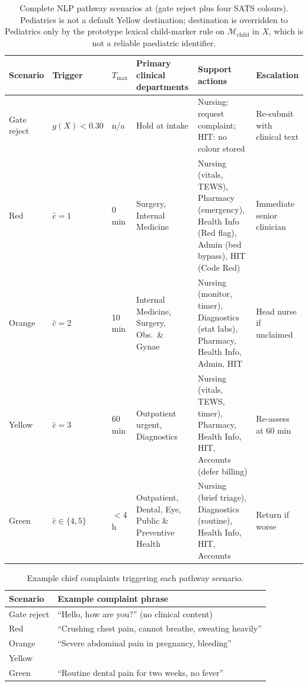 \begin{table}[H]
\centering
\scriptsize
\begin{tabular}{|p{1.5cm}|p{1.6cm}|p{0.9cm}|p{2.4cm}|p{3.1cm}|p{2.2cm}|}
\hline
\textbf{Scenario} & \textbf{Trigger} & \(T_{\max}\) & \textbf{Primary clinical departments} & \textbf{Support actions} & \textbf{Escalation} \\
\hline
Gate reject & \(g(X)<0.30\) & n/a & Hold at intake & Nursing: request complaint; HIT: no colour stored & Re-submit with clinical text \\
Red & \(\hat{c}=1\) & 0 min & Surgery, Internal Medicine & Nursing (vitals, TEWS), Pharmacy (emergency), Health Info (Red flag), Admin (bed bypass), HIT (Code Red) & Immediate senior clinician \\
Orange & \(\hat{c}=2\) & 10 min & Internal Medicine, Surgery, Obs.\ \& Gynae & Nursing (monitor, timer), Diagnostics (stat labs), Pharmacy, Health Info, Admin, HIT & Head nurse if unclaimed \\
Yellow & \(\hat{c}=3\) & 60 min & Outpatient urgent, Diagnostics & Nursing (vitals, TEWS, timer), Pharmacy, Health Info, HIT, Accounts (defer billing) & Re-assess at 60 min \\
Green & \(\hat{c}\in\{4,5\}\) & \(<\)4 h & Outpatient, Dental, Eye, Public \& Preventive Health & Nursing (brief triage), Diagnostics (routine), Health Info, HIT, Accounts & Return if worse \\
\hline
\end{tabular}
\caption{Complete NLP pathway scenarios at \examplehospital{} (gate reject plus four SATS colours). Pediatrics is not a default Yellow destination; destination is overridden to Pediatrics only by the prototype lexical child-marker rule on \(\mathcal{M}_{\mathrm{child}}\) in \(X\), which is not a reliable paediatric identifier.}
\label{tab:pathway-scenarios}
\end{table}

\begin{table}[H]
\centering
\scriptsize
\begin{tabular}{|l|p{10cm}|}
\hline
\textbf{Scenario} & \textbf{Example complaint phrase} \\
\hline
Gate reject & ``Hello, how are you?'' (no clinical content) \\
Red & ``Crushing chest pain, cannot breathe, sweating heavily'' \\
Orange & ``Severe abdominal pain in pregnancy, bleeding'' \\
Yellow & \runningcomplaint{} \\
Green & ``Routine dental pain for two weeks, no fever'' \\
\hline
\end{tabular}
\caption{Example chief complaints triggering each pathway scenario.}
\label{tab:pathway-examples}
\end{table}

